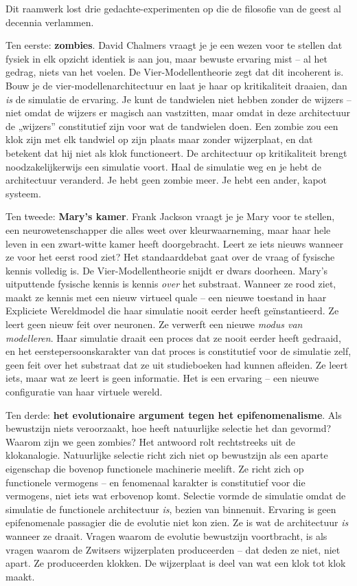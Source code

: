 \documentclass[11pt, twoside, openright]{book}
\begin{document}
Dit raamwerk lost drie gedachte-experimenten op die de filosofie van de geest al decennia verlammen.

Ten eerste: \textbf{zombies}. David Chalmers vraagt je je een wezen voor te stellen dat fysiek in elk opzicht identiek is aan jou, maar bewuste ervaring mist -- al het gedrag, niets van het voelen. De Vier-Modellentheorie zegt dat dit incoherent is. Bouw je de vier-modellenarchitectuur en laat je haar op kritikaliteit draaien, dan \textit{is} de simulatie de ervaring. Je kunt de tandwielen niet hebben zonder de wijzers -- niet omdat de wijzers er magisch aan vastzitten, maar omdat in deze architectuur de „wijzers” constitutief zijn voor wat de tandwielen doen. Een zombie zou een klok zijn met elk tandwiel op zijn plaats maar zonder wijzerplaat, en dat betekent dat hij niet als klok functioneert. De architectuur op kritikaliteit brengt noodzakelijkerwijs een simulatie voort. Haal de simulatie weg en je hebt de architectuur veranderd. Je hebt geen zombie meer. Je hebt een ander, kapot systeem.

Ten tweede: \textbf{Mary's kamer}. Frank Jackson vraagt je je Mary voor te stellen, een neurowetenschapper die alles weet over kleurwaarneming, maar haar hele leven in een zwart-witte kamer heeft doorgebracht. Leert ze iets nieuws wanneer ze voor het eerst rood ziet? Het standaarddebat gaat over de vraag of fysische kennis volledig is. De Vier-Modellentheorie snijdt er dwars doorheen. Mary's uitputtende fysische kennis is kennis \textit{over} het substraat. Wanneer ze rood ziet, maakt ze kennis met een nieuw virtueel quale -- een nieuwe toestand in haar Expliciete Wereldmodel die haar simulatie nooit eerder heeft geïnstantieerd. Ze leert geen nieuw feit over neuronen. Ze verwerft een nieuwe \textit{modus van modelleren}. Haar simulatie draait een proces dat ze nooit eerder heeft gedraaid, en het eerstepersoonskarakter van dat proces is constitutief voor de simulatie zelf, geen feit over het substraat dat ze uit studieboeken had kunnen afleiden. Ze leert iets, maar wat ze leert is geen informatie. Het is een ervaring -- een nieuwe configuratie van haar virtuele wereld.

Ten derde: \textbf{het evolutionaire argument tegen het epifenomenalisme}. Als bewustzijn niets veroorzaakt, hoe heeft natuurlijke selectie het dan gevormd? Waarom zijn we geen zombies? Het antwoord rolt rechtstreeks uit de klokanalogie. Natuurlijke selectie richt zich niet op bewustzijn als een aparte eigenschap die bovenop functionele machinerie meelift. Ze richt zich op functionele vermogens -- en fenomenaal karakter is constitutief voor die vermogens, niet iets wat erbovenop komt. Selectie vormde de simulatie omdat de simulatie de functionele architectuur \textit{is}, bezien van binnenuit. Ervaring is geen epifenomenale passagier die de evolutie niet kon zien. Ze is wat de architectuur \textit{is} wanneer ze draait. Vragen waarom de evolutie bewustzijn voortbracht, is als vragen waarom de Zwitsers wijzerplaten produceerden -- dat deden ze niet, niet apart. Ze produceerden klokken. De wijzerplaat is deel van wat een klok tot klok maakt.
\end{document}
